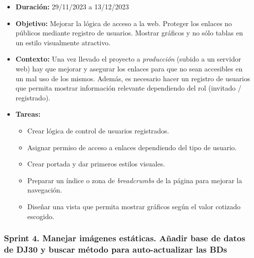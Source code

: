 \begin{itemize}
\item  
\textbf{Duración:} 29/11/2023 a 13/12/2023

\item
\textbf{Objetivo:} Mejorar la lógica de acceso a la web. Proteger los enlaces no públicos mediante registro de usuarios. Mostrar gráficos y no sólo tablas en un estilo visualmente atractivo. 

\item
\textbf{Contexto:} Una vez llevado el proyecto a \emph{producción} (subido a un servidor web) hay que mejorar y asegurar los enlaces para que no sean accesibles en un mal uso de los mismos. Además, es necesario hacer un registro de usuarios que permita mostrar información relevante dependiendo del rol (invitado / registrado). 

\item
\textbf{Tareas:}
	\begin{itemize}
	\tightlist
	\item 
	Crear lógica de control de usuarios registrados.
	\item 	
	Asignar permiso de acceso a enlaces dependiendo del tipo de usuario. 
	\item 
	Crear portada y dar primeros estilos visuales. 
  	\item 
  	Preparar un índice o zona de \emph{breadcrumbs} de la página para mejorar la navegación.
  	\item 
  	Diseñar una vista que permita mostrar gráficos según el valor cotizado escogido. 
  	\end{itemize}
\end{itemize}


\subsubsection{Sprint 4. Manejar imágenes estáticas. Añadir base de datos de DJ30 y buscar método para auto-actualizar las BDs}

